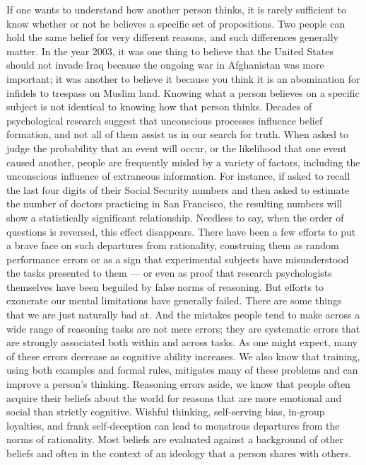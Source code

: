 \documentclass[a4paper,14pt]{extarticle}
\begin{document}
If one wants to understand how another person thinks, it is rarely sufficient to know whether or not he believes a specific set of propositions.
Two people can hold the same belief for very different reasons, and such differences generally matter.
In the year 2003, it was one thing to believe that the United States should not invade Iraq because the ongoing war in Afghanistan was more important;
it was another to believe it because you think it is an abomination for infidels to trespass on Muslim land.
Knowing what a person believes on a specific subject is not identical to knowing how that person thinks.
Decades of psychological research suggest that unconscious processes influence belief formation, and not all of them assist us in our search for truth.
When asked to judge the probability that an event will occur, or the likelihood that one event caused another, people are frequently misled by a variety of factors, including the unconscious influence of extraneous information.
For instance, if asked to recall the last four digits of their Social Security numbers and then asked to estimate the number of doctors practicing in San Francisco, the resulting numbers will show a statistically significant relationship.
Needless to say, when the order of questions is reversed, this effect disappears.
There have been a few efforts to put a brave face on such departures from rationality, construing them as random performance errors or as a sign that experimental subjects have misunderstood the tasks presented to them --- or even as proof that research psychologists themselves have been beguiled by false norms of reasoning.
But efforts to exonerate our mental limitations have generally failed.
There are some things that we are just naturally bad at.
And the mistakes people tend to make across a wide range of reasoning tasks are not mere errors;
they are systematic errors that are strongly associated both within and across tasks.
As one might expect, many of these errors decrease as cognitive ability increases.
We also know that training, using both examples and formal rules, mitigates many of these problems and can improve a person’s thinking.
Reasoning errors aside, we know that people often acquire their beliefs about the world for reasons that are more emotional and social than strictly cognitive.
Wishful thinking, self-serving bias, in-group loyalties, and frank self-deception can lead to monstrous departures from the norms of rationality.
Most beliefs are evaluated against a background of other beliefs and often in the context of an ideology that a person shares with others.
\end{document}
